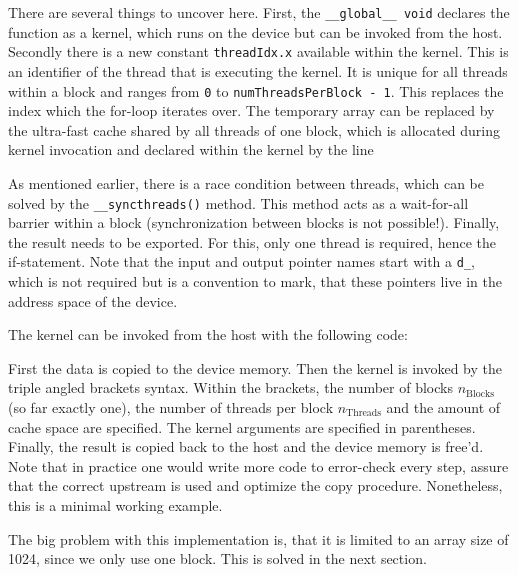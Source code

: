 

There are several things to uncover here. First, the \texttt{\_\_global\_\_ void} declares the function as a kernel, which runs on the device but can be invoked from the host. 
Secondly there is a new constant \texttt{threadIdx.x} available within the kernel.
This is an identifier of the thread that is executing the kernel.
It is unique for all threads within a block and ranges from \texttt{0} to \texttt{numThreadsPerBlock - 1}.
This replaces the index which the for-loop iterates over.
The temporary array can be replaced by the ultra-fast cache shared by all threads of one block, which is allocated during kernel invocation and declared within the kernel by the line

\lstset{firstnumber = 5}

\lstset{firstnumber = 1}

As mentioned earlier, there is a race condition between threads, which can be solved by the \texttt{\_\_syncthreads()} method.
This method acts as a wait-for-all barrier within a block (synchronization between blocks is not possible!).
Finally, the result needs to be exported.
For this, only one thread is required, hence the if-statement.
Note that the input and output pointer names start with a \texttt{d\_}, which is not required but is a convention to mark, that these pointers live in the address space of the device.

The kernel can be invoked from the host with the following code:



First the data is copied to the device memory.
Then the kernel is invoked by the triple angled brackets syntax.
Within the brackets, the number of blocks \( n_\mathrm{Blocks} \) (so far exactly one), the number of threads per block \( n_{\mathrm{Threads}} \) and the amount of cache space are specified.
The kernel arguments are specified in parentheses.
Finally, the result is copied back to the host and the device memory is free'd.
Note that in practice one would write more code to error-check every step, assure that the correct upstream is used and optimize the copy procedure.
Nonetheless, this is a minimal working example.

The big problem with this implementation is, that it is limited to an array size of 1024, since we only use one block.
This is solved in the next section.


